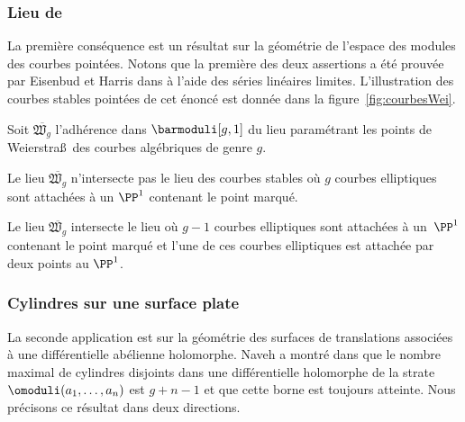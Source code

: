 \subsubsection*{Lieu de \Weierstrass}
La première conséquence est un résultat sur la géométrie de l'espace des modules des courbes pointées. Notons que la première des deux assertions a été prouvée par Eisenbud et Harris dans \cite[Th.\,3.1]{eiha} à l'aide des séries linéaires limites. L'illustration des courbes stables pointées de cet énoncé est donnée dans la figure~\ref{fig:courbesWei}.
\begin{prop}\label{prop:limWei}
Soit $\overline{\mathfrak{W}_{g}}$ l'adhérence dans $\barmoduli[g,1]$ du lieu paramétrant les points de Weierstra\ss{}~des courbes algébriques de genre $g$.
\begin{enumeratei}
\item\label{prop:limWeii}
Le lieu $\overline{\mathfrak{W}_{g}}$ n’intersecte pas le lieu des courbes stables où $g$ courbes elliptiques sont attachées à un $\PP^{1}$ contenant le point marqué.
\item\label{prop:limWeiii}
Le lieu $\overline{\mathfrak{W}_{g}}$ intersecte le lieu où $g-1$ courbes elliptiques sont attachées à un~$\PP^{1}$ contenant le point marqué et l'une de ces courbes elliptiques est attachée par deux points au $\PP^{1}$.
\end{enumeratei}
\end{prop}

\subsubsection*{Cylindres sur une surface plate}
La seconde application est sur la géométrie des surfaces de translations associées à une différentielle abélienne holomorphe. Naveh a montré dans \cite{Na} que le nombre maximal de cylindres disjoints dans une différentielle holomorphe de la strate $\omoduli(a_{1},\dots,a_{n})$ est $g+n-1$ et que cette borne est toujours atteinte. Nous précisons ce résultat dans deux directions.

